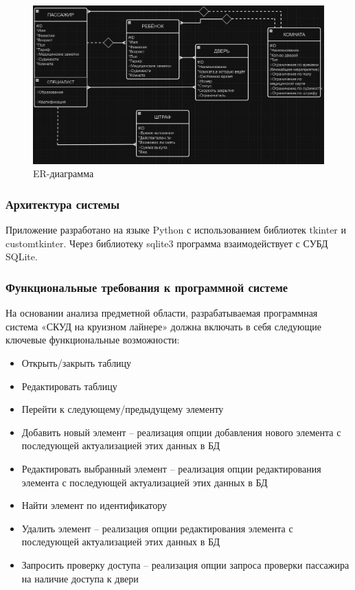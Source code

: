 \begin{figure}[ht]
	\centering
	\includegraphics[width=1\linewidth]{images/ER}
	\caption{ER-диаграмма}
	\label{fig:er}
\end{figure}


\subsubsection{Архитектура системы}

Приложение разработано на языке Python с использованием библиотек tkinter и customtkinter. Через библиотеку sqlite3 программа взаимодействует с СУБД SQLite.

\subsubsection{Функциональные требования к программной системе}

На основании анализа предметной области, разрабатываемая программная система «СКУД на круизном лайнере» должна включать в себя следующие ключевые функциональные возможности:
\begin{itemize}
	\item Открыть/закрыть таблицу
	\item Редактировать таблицу
	\item Перейти к следующему/предыдущему элементу
	\item Добавить новый элемент -- реализация опции добавления нового элемента с последующей актуализацией этих данных в БД 
	\item Редактировать выбранный элемент -- реализация опции редактирования элемента с последующей актуализацией этих данных в БД 
	\item Найти элемент по идентификатору
	\item Удалить элемент -- реализация опции редактирования элемента с последующей актуализацией этих данных в БД
	\item Запросить проверку доступа -- реализация опции запроса проверки пассажира на наличие доступа к двери
\end{itemize}

